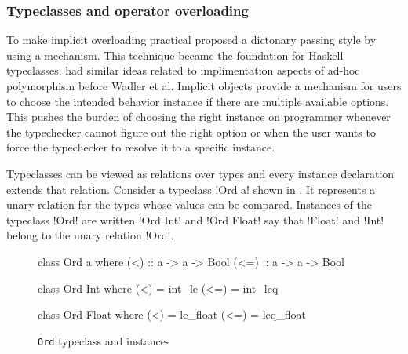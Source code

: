 \documentclass[manuscript,screen,nonacm]{acmart}
\begin{document}
\subsubsection{Typeclasses and operator overloading}
To make implicit overloading practical \citet{wadler_polymorphism_1989} proposed a dictonary passing style by using a mechanism. This technique became the foundation for Haskell\cite{haskell_2010} typeclasses. \cite{kaes_parametric_1988} had similar ideas related to implimentation aspects of ad-hoc polymorphism before Wadler et al. Implicit objects\cite{oliveira_typeclasses_2010} provide a mechanism for users to choose the intended behavior instance if there are multiple available options. This pushes the burden of choosing the right instance on programmer whenever the typechecker cannot figure out the right option or when the user wants to force the typechecker to resolve it to a specific instance.

Typeclasses can be viewed as relations over types and every instance declaration extends that relation. Consider a typeclass !Ord a! shown in . It represents a unary relation for the types whose values can be compared. Instances of the typeclass !Ord! are written !Ord Int! and !Ord Float! say that !Float! and !Int! belong to the unary relation !Ord!.


\begin{figure}[ht]
  \centering
  \begin{minipage}[ht]{0.3\linewidth}
    \begin{code}
      class Ord a where
         (<)  :: a -> a -> Bool
         (<=) :: a -> a -> Bool
    \end{code}
  \end{minipage}%
  \begin{minipage}[ht]{0.3\linewidth}
    \begin{code}
      class Ord Int where
         (<)  = int_le
         (<=) = int_leq
    \end{code}
  \end{minipage}%
  \begin{minipage}[ht]{0.3\linewidth}
    \begin{code}
      class Ord Float where
         (<)  = le_float
         (<=) = leq_float
    \end{code}
  \end{minipage}
  \caption{\lstinline{Ord} typeclass and instances}
  \label{fig:tc-ord}
\end{figure}
\end{document}
